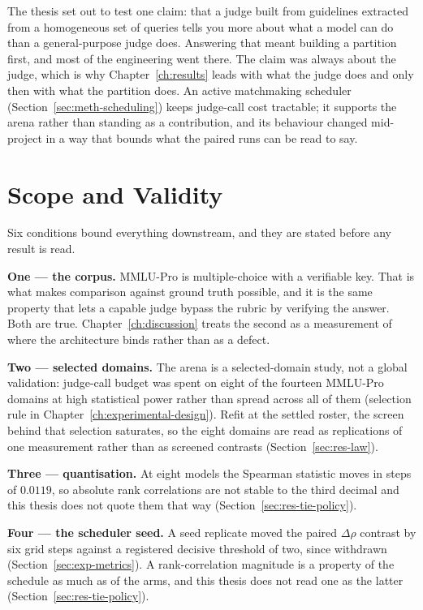 The thesis set out to test one claim: that a judge built from
guidelines extracted from a homogeneous set of queries tells you more
about what a model can do than a general-purpose judge does. Answering
that meant building a partition first, and most of the engineering went
there. The claim was always about the judge, which is why
Chapter~\ref{ch:results} leads with what the judge does and only then
with what the partition does. An active matchmaking scheduler
(Section~\ref{sec:meth-scheduling}) keeps judge-call cost tractable; it
supports the arena rather than standing as a contribution, and its
behaviour changed mid-project in a way that bounds what the paired runs
can be read to say.

\section{Scope and Validity}\label{sec:intro-scope}

Six conditions bound everything downstream, and they are stated before
any result is read.

\textbf{One --- the corpus.} MMLU-Pro is multiple-choice with a
verifiable key. That is what makes comparison against ground truth
possible, and it is the same property that lets a capable judge bypass
the rubric by verifying the answer. Both are true.
Chapter~\ref{ch:discussion} treats the second as a measurement of where
the architecture binds rather than as a defect.

\textbf{Two --- selected domains.} The arena is a selected-domain
study, not a global validation: judge-call budget was spent on eight
of the fourteen MMLU-Pro domains at high statistical power rather
than spread across all of them (selection rule in
Chapter~\ref{ch:experimental-design}). Refit at the settled roster,
the screen behind that selection saturates, so the eight domains are
read as replications of one measurement rather than as screened
contrasts (Section~\ref{sec:res-law}).

\textbf{Three --- quantisation.} At eight models the Spearman
statistic moves in steps of $0.0119$, so absolute rank correlations
are not stable to the third decimal and this thesis does not quote
them that way (Section~\ref{sec:res-tie-policy}).

\textbf{Four --- the scheduler seed.} A seed replicate moved the
paired $\Delta\rho$ contrast by six grid steps against a registered
decisive threshold of two, since withdrawn
(Section~\ref{sec:exp-metrics}). A rank-correlation magnitude is a
property of the schedule as much as of the arms, and this thesis does
not read one as the latter (Section~\ref{sec:res-tie-policy}).

